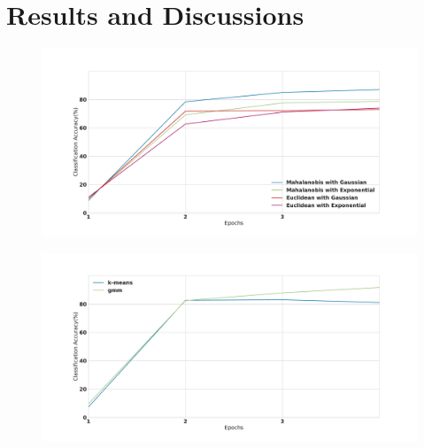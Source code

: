 \documentclass[runningheads]{llncs}
\begin{document}
\section{Results and Discussions}
\begin{figure}
\centering
\begin{minipage}{.5\textwidth}
  \centering
  \includegraphics[width=.9\linewidth]{classification_accuracy_hyperparameter}
  \label{classification_acc_hyper_parameter}
\end{minipage}%
\begin{minipage}{.5\textwidth}
  \centering
  \includegraphics[width=.9\linewidth]{classification_accuracy_kmeans_gmm}
  \label{classification_acc_kmeans_gmm}
\end{minipage}
\end{figure}
\end{document}
